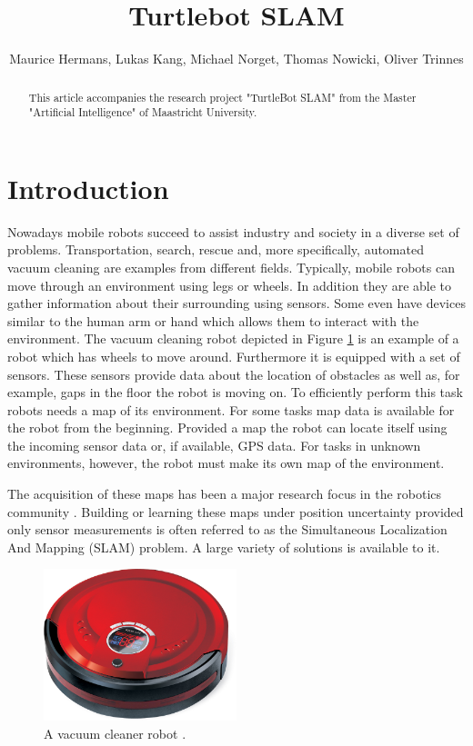 \documentclass{ba-kecs}
\title{Turtlebot SLAM }
\author{Maurice Hermans, Lukas Kang, Michael Norget, Thomas Nowicki, Oliver Trinnes}
\begin{document}
\maketitle

\begin{abstract}
This article accompanies the research project "TurtleBot SLAM" from the Master "Artificial Intelligence" of Maastricht University.
\end{abstract}

\section{Introduction}
\label{sec:intro}
Nowadays mobile robots succeed to assist industry and society in a diverse set of problems. Transportation, search, rescue and, more specifically, automated vacuum cleaning are examples from different fields. Typically, mobile robots can move through an environment using legs or wheels. In addition they are able to gather information about their surrounding using sensors. Some even have devices similar to the human arm or hand which allows them to interact with the environment. The vacuum cleaning robot depicted in Figure \ref{fig:vacuum_cleaner} is an example of a robot which has wheels to move around. Furthermore it is equipped with a set of sensors. These sensors provide data about the location of obstacles as well as, for example, gaps in the floor the robot is moving on. To efficiently perform this task robots needs a map of its environment. For some tasks map data is available for the robot from the beginning. Provided a map the robot can locate itself using the incoming sensor data or, if available, GPS data. For tasks in unknown environments, however, the robot must make its own map of the environment.

The acquisition of these maps has been a major research focus in the robotics community \cite{ Grisetti, Montemerlo02, Montemerlo, Thrun}. Building or learning these maps under position uncertainty provided only sensor measurements is often referred to as the Simultaneous Localization And Mapping (SLAM) problem. A large variety of solutions is available to it.
\begin{figure}[h]
	\centering
		\includegraphics[width=0.50\textwidth]{figures/vacuum_cleaner.jpg}
	\caption{A vacuum cleaner robot \citep{VacuumRobot}.}
	\label{fig:vacuum_cleaner}
\end{figure}
\end{document}
